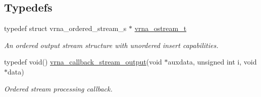 \subsection*{Typedefs}
\begin{DoxyCompactItemize}
\item 
\mbox{\label{group__buffer__utils_ga8da189552af21ab6e4e88bdcc240870c}} 
typedef struct vrna\+\_\+ordered\+\_\+stream\+\_\+s $\ast$ \hyperlink{group__buffer__utils_ga8da189552af21ab6e4e88bdcc240870c}{vrna\+\_\+ostream\+\_\+t}
\begin{DoxyCompactList}\small\item\em An ordered output stream structure with unordered insert capabilities. \end{DoxyCompactList}\item 
typedef void() \hyperlink{group__buffer__utils_ga4adb94338a6f0a1a451e03c1bdac0d9d}{vrna\+\_\+callback\+\_\+stream\+\_\+output}(void $\ast$auxdata, unsigned int i, void $\ast$data)
\begin{DoxyCompactList}\small\item\em Ordered stream processing callback. \end{DoxyCompactList}\end{DoxyCompactItemize}
